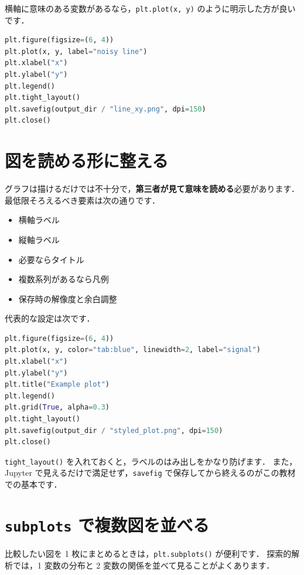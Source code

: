 横軸に意味のある変数があるなら，\texttt{plt.plot(x, y)} のように明示した方が良いです．

\begin{lstlisting}[style=codecell,language=Python]
plt.figure(figsize=(6, 4))
plt.plot(x, y, label="noisy line")
plt.xlabel("x")
plt.ylabel("y")
plt.legend()
plt.tight_layout()
plt.savefig(output_dir / "line_xy.png", dpi=150)
plt.close()
\end{lstlisting}



\section{図を読める形に整える}

グラフは描けるだけでは不十分で，\textbf{第三者が見て意味を読める}必要があります．
最低限そろえるべき要素は次の通りです．
\begin{itemize}
\item 横軸ラベル
\item 縦軸ラベル
\item 必要ならタイトル
\item 複数系列があるなら凡例
\item 保存時の解像度と余白調整
\end{itemize}

代表的な設定は次です．

\begin{lstlisting}[style=codecell,language=Python]
plt.figure(figsize=(6, 4))
plt.plot(x, y, color="tab:blue", linewidth=2, label="signal")
plt.xlabel("x")
plt.ylabel("y")
plt.title("Example plot")
plt.legend()
plt.grid(True, alpha=0.3)
plt.tight_layout()
plt.savefig(output_dir / "styled_plot.png", dpi=150)
plt.close()
\end{lstlisting}

\texttt{tight\_layout()} を入れておくと，ラベルのはみ出しをかなり防げます．
また，Jupyter で見えるだけで満足せず，\texttt{savefig} で保存してから終えるのがこの教材での基本です．


\section{\texttt{subplots} で複数図を並べる}

比較したい図を 1 枚にまとめるときは，\texttt{plt.subplots()} が便利です．
探索的解析では，1 変数の分布と 2 変数の関係を並べて見ることがよくあります．

